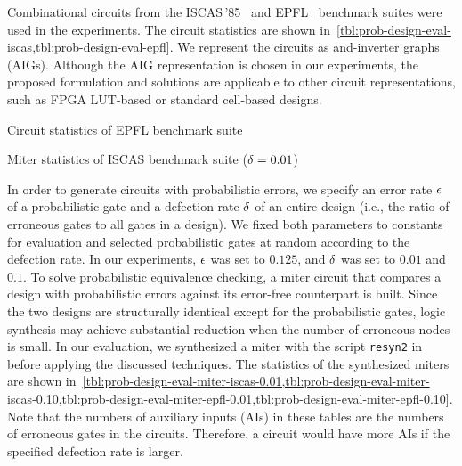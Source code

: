 Combinational circuits from the ISCAS\,'85~\cite{ISCAS85-benchmark}
and EPFL~\cite{EPFL-benchmark} benchmark suites were used in the experiments.
The circuit statistics are shown in~\cref{tbl:prob-design-eval-iscas,tbl:prob-design-eval-epfl}.
We represent the circuits as and-inverter graphs (AIGs).
Although the AIG representation is chosen in our experiments,
the proposed formulation and solutions are applicable to other circuit representations,
such as FPGA LUT-based or standard cell-based designs.

\begin{table}[hp]
    \centering
    \footnotesize
    \caption{Circuit statistics of EPFL benchmark suite}
    \label{tbl:prob-design-eval-epfl}
\end{table}

\begin{table}[ht]
    \centering
    \footnotesize
    \caption{Miter statistics of ISCAS benchmark suite ($\delta=0.01$)}
    \label{tbl:prob-design-eval-miter-iscas-0.01}
\end{table}

In order to generate circuits with probabilistic errors,
we specify an error rate $\epsilon$ of a probabilistic gate and
a defection rate $\delta$ of an entire design (i.e., the ratio of erroneous gates to all gates in a design).
We fixed both parameters to constants for evaluation
and selected probabilistic gates at random according to the defection rate.
In our experiments, $\epsilon$ was set to $0.125$, and $\delta$ was set to $0.01$ and $0.1$.
To solve probabilistic equivalence checking,
a miter circuit that compares a design with probabilistic errors against its error-free counterpart is built.
Since the two designs are structurally identical except for the probabilistic gates,
logic synthesis may achieve substantial reduction when the number of erroneous nodes is small.
In our evaluation,
we synthesized a miter with the script \texttt{resyn2} in \abc before applying the discussed techniques.
The statistics of the synthesized miters are shown in~\cref{tbl:prob-design-eval-miter-iscas-0.01,tbl:prob-design-eval-miter-iscas-0.10,tbl:prob-design-eval-miter-epfl-0.01,tbl:prob-design-eval-miter-epfl-0.10}.
Note that the numbers of auxiliary inputs (AIs) in these tables are the numbers of erroneous gates in the circuits.
Therefore, a circuit would have more AIs if the specified defection rate is larger.


